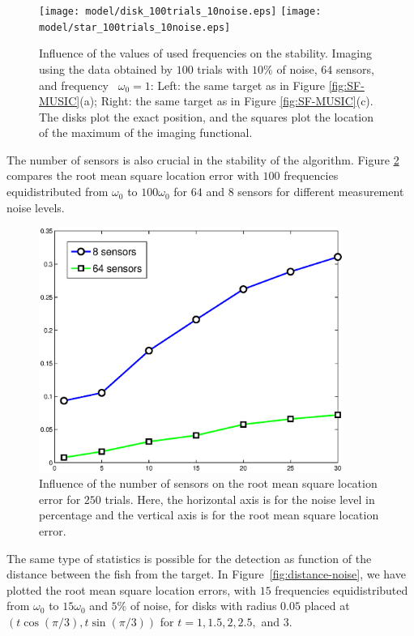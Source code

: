 \begin{figure}
\centering%
\texttt{[image: model/disk\_100trials\_10noise.eps]} \hspace{0.2cm}
\texttt{[image: model/star\_100trials\_10noise.eps]}
\caption{\label{fig:noise-freq_100} Influence of the values of
used frequencies on the stability. Imaging using the data obtained
by $100$ trials with $10\%$ of noise, $64$ sensors, and frequency
~$\omega_0=1$:  Left: the same target as in Figure
\ref{fig:SF-MUSIC}(a); Right: the same target as in Figure
\ref{fig:SF-MUSIC}(c). The disks plot the exact position, and the
squares plot the location of the maximum of the imaging
functional.}
\end{figure}



The number of sensors is also crucial in the stability of the
algorithm. Figure \ref{fig:stats-sensors-noise} compares the root
mean square location error with $100$ frequencies equidistributed
from $\omega_0$ to $100 \omega_0$ for $64$ and $8$ sensors for
different measurement noise levels.

\begin{figure}
\centering\includegraphics[height=8cm]{model/stats-sensors-noise.eps}\caption{\label{fig:stats-sensors-noise}Influence
of the number of sensors on the root mean square location error
for $250$ trials. Here, the horizontal axis is for the noise level
in percentage and the vertical axis is for the root mean square
location error.}
\end{figure}


The same type of statistics is possible for the detection as
function of the distance between the fish from the target. In
Figure~\ref{fig:distance-noise}, we have plotted the root mean
square location errors, with $15$ frequencies equidistributed from
$\omega_0$ to $15 \omega_0$  and $5\%$ of noise, for disks with
radius $0.05$ placed at $(t\cos(\pi/3),t\sin(\pi/3))$ for $t=1,
1.5, 2, 2.5,$ and $3$.

